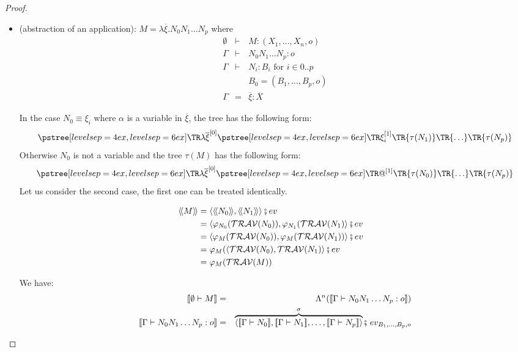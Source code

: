\begin{proof}
\begin{itemize}
    \item (abstraction of an application): $M = \lambda \overline{\xi} . N_0 N_1 \ldots N_p$ where
    \begin{eqnarray*}
    \emptyset &\vdash& M : (X_1,\ldots,X_n,o) \\
    \Gamma &\vdash& N_0 N_1 \ldots N_p : o \\
    \Gamma &\vdash& N_i : B_i \mbox{ for } i \in 0..p \\
    && B_0 = (B_1,\ldots,B_p,o) \\
    \Gamma &=& \overline{\xi} : \overline{X}
    \end{eqnarray*}

    In the case $N_0 \equiv \xi_i$ where $\alpha$ is a variable in $\overline{\xi}$, the tree has the following form:
    $$ \tree[levelsep=6ex]{\lambda \overline{\xi}^{[0]}}
        { \tree[levelsep=6ex]{\xi_i^{[1]}}
            {   \TR{\tau(N_1)} \TR{\ldots} \TR{\tau(N_p)}}}
    $$
    Otherwise $N_0$ is not a variable and the tree $\tau(M)$ has the following form:
    $$ \tree[levelsep=6ex]{\lambda \overline{\xi}^{[0]}}
        { \tree[levelsep=6ex]{@^{[1]}}
            {   \TR{\tau(N_0)} \TR{\ldots} \TR{\tau(N_p)}}}
    $$
    Let us consider the second case, the first one can
    be treated identically.

\begin{align*}
  {\langle\!\langle M \rangle\!\rangle} &=
      \langle {\langle\!\langle N_0 \rangle\!\rangle}, {\langle\!\langle N_1 \rangle\!\rangle} \rangle \fatsemi ev
           & \\
    &=  \langle \varphi_{N_0} (\mathcal{TRAV}(N_0)), \varphi_{N_1}(\mathcal{TRAV}(N_1) \rangle \fatsemi ev
           & \\
    &=  \langle \varphi_{M} (\mathcal{TRAV}(N_0)), \varphi_{M}(\mathcal{TRAV}(N_1)) \rangle \fatsemi ev
           & \\
    &=  \varphi_{M}( \langle \mathcal{TRAV}(N_0), \mathcal{TRAV}(N_1) \rangle \fatsemi ev
           & \\
    &=  \varphi_{M}( \mathcal{TRAV}(M) )
           &
\end{align*}

    We have:
    \begin{eqnarray*}
    \sem{ \emptyset \vdash M} &=& \Lambda^n( \sem{\Gamma \vdash N_0 N_1 \ldots N_p : o} ) \\
    \sem{\Gamma \vdash N_0  N_1 \ldots N_p : o} &=& \overbrace{\langle \sem{\Gamma \vdash N_0}, \sem{\Gamma \vdash N_1}, \ldots, \sem{\Gamma \vdash N_p} \rangle}^\sigma \fatsemi\ ev_{B_1,\ldots,B_p,o}
    \end{eqnarray*}


\end{itemize}
\end{proof}
